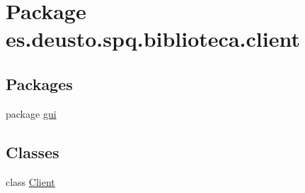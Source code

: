 \hypertarget{namespacees_1_1deusto_1_1spq_1_1biblioteca_1_1client}{}\section{Package es.\+deusto.\+spq.\+biblioteca.\+client}
\label{namespacees_1_1deusto_1_1spq_1_1biblioteca_1_1client}
\subsection*{Packages}
\begin{DoxyCompactItemize}
\item 
package \mbox{\hyperlink{namespacees_1_1deusto_1_1spq_1_1biblioteca_1_1client_1_1gui}{gui}}
\end{DoxyCompactItemize}
\subsection*{Classes}
\begin{DoxyCompactItemize}
\item 
class \mbox{\hyperlink{classes_1_1deusto_1_1spq_1_1biblioteca_1_1client_1_1_client}{Client}}
\end{DoxyCompactItemize}
